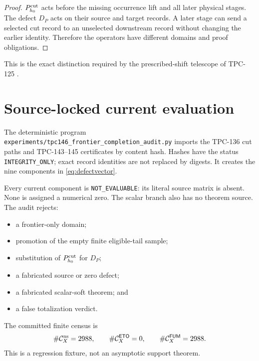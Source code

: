 \documentclass[11pt]{article}
\theoremstyle{definition}
\theoremstyle{remark}
\begin{document}
\begin{proof}
\(P_{h_0}^{\rm cut}\) acts before the missing occurrence lift and all
later physical stages.  The defect \(D_P\) acts on their source and
target records.  A later stage can send a selected cut record to an
unselected downstream record without changing the earlier identity.
Therefore the operators have different domains and proof
obligations.
\end{proof}

This is the exact distinction required by the prescribed-shift
telescope of TPC-125 \citep{WangTPC125}.

\section{Source-locked current evaluation}

The deterministic program
\texttt{experiments/tpc146\_frontier\_completion\_audit.py} imports
the TPC-136 cut paths and TPC-143--145 certificates by content hash.
Hashes have the status \texttt{INTEGRITY\_ONLY}; exact record
identities are not replaced by digests.  It creates the nine
components in \eqref{eq:defectvector}.

Every current component is \texttt{NOT\_EVALUABLE}: its literal
source matrix is absent.  None is assigned a numerical zero.  The
scalar branch also has no theorem source.  The audit rejects:
\begin{itemize}[leftmargin=2em]
\item a frontier-only domain;
\item promotion of the empty finite eligible-tail sample;
\item substitution of \(P_{h_0}^{\rm cut}\) for \(D_P\);
\item a fabricated source or zero defect;
\item a fabricated scalar-soft theorem; and
\item a false totalization verdict.
\end{itemize}

The committed finite census is
\[
 \#\mathcal C_X^{\rm ns}=2988,\qquad
 \#\mathcal C_X^{\mathsf{ETO}}=0,\qquad
 \#\mathcal C_X^{\mathsf{FUM}}=2988.
\]
This is a regression fixture, not an asymptotic support theorem.
\end{document}
